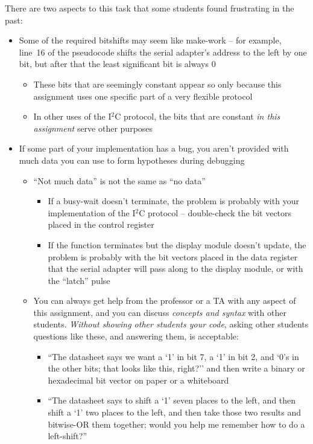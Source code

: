 {    There are two aspects to this task that some students found frustrating in the past:
    \begin{itemize}
        \item Some of the required bitshifts may seem like make-work -- for example, line~16 of the pseudocode shifts the serial adapter's address to the left by one bit, but after that the least significant bit is always 0
            \begin{itemize}
                \item These bits that are seemingly constant appear so only because this assignment uses one specific part of a very flexible protocol
                \item In other uses of the I$^2$C protocol, the bits that are constant \textit{in this assignment} serve other purposes
            \end{itemize}
        \item If some part of your implementation has a bug, you aren't provided with much data you can use to form hypotheses during debugging
            \begin{itemize}
                \item ``Not much data'' is not the same as ``no data''
                    \begin{itemize}
                        \item If a busy-wait doesn't terminate, the problem is probably with your implementation of the I$^2$C protocol -- double-check the bit vectors placed in the control register%
                        \item If the function terminates but the display module doesn't update, the problem is probably with the bit vectors placed in the data register that the serial adapter will pass along to the display module, or with the ``latch'' pulse
                    \end{itemize}
                \item You can always get help from the professor or a TA with any aspect of this assignment, and you can discuss \textit{concepts and syntax} with other students.
                    \textit{Without showing other students your code}, asking other students questions like these, and answering them, is acceptable:
                    \begin{itemize}
                        \item ``The datasheet says we want a `1' in bit 7, a `1' in bit 2, and `0's in the other bits; that looks like this, right?'' and then write a binary or hexadecimal bit vector on paper or a whiteboard
                        \item ``The datasheet says to shift a `1' seven places to the left, and then shift a `1' two places to the left, and then take those two results and bitwise-OR them together; would you help me remember how to do a left-shift?''
                    \end{itemize}
            \end{itemize}
    \end{itemize}
}{}

